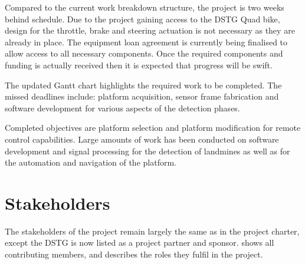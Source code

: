 \documentclass[main.tex]{subfiles}
\begin{document}
Compared to the current work breakdown structure, the project is two weeks behind schedule. Due to the project gaining access to the DSTG Quad bike, design for the throttle, brake and steering actuation is not necessary as they are already in place. The equipment loan agreement is currently being finalised to allow access to all necessary components. Once the required components and funding is actually received then it is expected that progress will be swift. 

The updated Gantt chart highlights the required work to be completed. The missed deadlines include: platform acquisition, sensor frame fabrication and software development for various aspects of the detection phases. 

Completed objectives are platform selection and platform modification for remote control capabilities. Large amounts of work has been conducted on software development and signal processing for the detection of landmines as well as for the automation and navigation of the platform.

\section{Stakeholders}

The stakeholders of the project remain largely the same as in the project charter, except the DSTG is now listed as a project partner and sponsor.  shows all contributing members, and describes the roles they fulfil in the project.  
\end{document}
